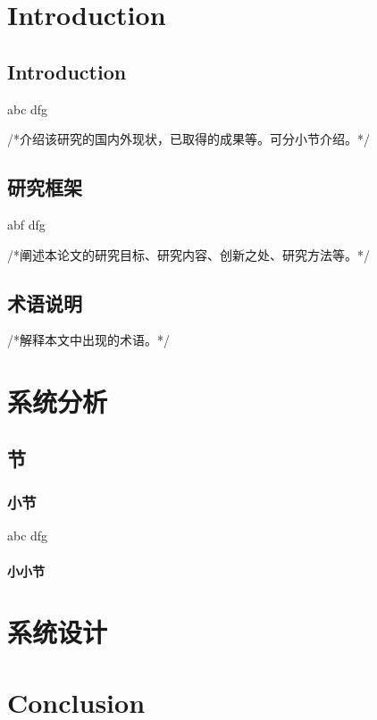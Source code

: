 \documentclass{jnuthesis}
\begin{document}
\tableofcontents

\chapter{Introduction}

\section{Introduction}
abc dfg

/*介绍该研究的国内外现状，已取得的成果等。可分小节介绍。*/

\section{研究框架}
abf dfg

/*阐述本论文的研究目标、研究内容、创新之处、研究方法等。*/

\section{术语说明}

/*解释本文中出现的术语。*/

\chapter{系统分析}

\section{节}

\subsection{小节}
abc dfg

\subsubsection{小小节}


\chapter{系统设计}

\chapter{Conclusion}
\end{document}

